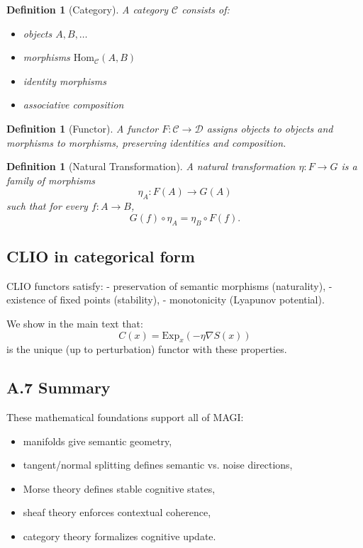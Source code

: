\documentclass[11pt,a4paper,twocolumn]{article}
\newtheorem{definition}[theorem]{Definition}
\begin{document}
\begin{definition}[Category]
A category $\mathcal{C}$ consists of:
\begin{itemize}
\item objects $A,B,\ldots$
\item morphisms $\mathrm{Hom}_{\mathcal{C}}(A,B)$
\item identity morphisms
\item associative composition
\end{itemize}
\end{definition}

\begin{definition}[Functor]
A functor $F : \mathcal{C} \to \mathcal{D}$ assigns objects to objects
and morphisms to morphisms, preserving identities and composition.
\end{definition}

\begin{definition}[Natural Transformation]
A natural transformation $\eta : F \to G$ is a family of morphisms
\[
\eta_A : F(A) \to G(A)
\]
such that for every $f : A \to B$,
\[
G(f) \circ \eta_A = \eta_B \circ F(f).
\]
\end{definition}

\subsection*{CLIO in categorical form}

CLIO functors satisfy:
- preservation of semantic morphisms (naturality),
- existence of fixed points (stability),
- monotonicity (Lyapunov potential).

We show in the main text that:
\[
C(x) = \mathrm{Exp}_x(-\eta\nabla S(x))
\]
is the unique (up to perturbation) functor with these properties.


\subsection*{A.7 Summary}

These mathematical foundations support all of MAGI:
\begin{itemize}
\item manifolds give semantic geometry,
\item tangent/normal splitting defines semantic vs. noise directions,
\item Morse theory defines stable cognitive states,
\item sheaf theory enforces contextual coherence,
\item category theory formalizes cognitive update.
\end{itemize}
\end{document}
